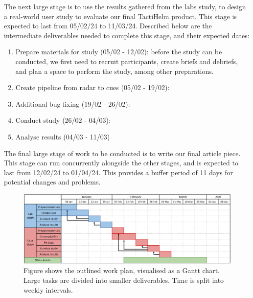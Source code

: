 \documentclass{interim}
\begin{document}
The next large stage is to use the results gathered from the labs study, to design a real-world user study to evaluate our final TactiHelm product. This stage is expected to last from 05/02/24 to 11/03/24. Described below are the intermediate deliverables needed to complete this stage, and their expected dates: 
\begin{enumerate}[label=2.\arabic*]
    \item Prepare materials for study (05/02 - 12/02): before the study can be conducted, we first need to recruit participants, create briefs and debriefs, and plan a space to perform the study, among other preparations.
    \item Create pipeline from radar to cues (05/02 - 19/02):
    \item Additional bug fixing (19/02 - 26/02):
    \item Conduct study (26/02 - 04/03):
    \item Analyse results (04/03 - 11/03)
\end{enumerate}

The final large stage of work to be conducted is to write our final article piece. This stage can run concurrently alongside the other stages, and is expected to last from 12/02/24 to 01/04/24. This provides a buffer period of 11 days for potential changes and problems.

\begin{figure}[!ht]
    \centering
    \includegraphics[width=1\textwidth]{images/work-plan.pdf}
    \caption{Figure shows the outlined work plan, visualised as a Gantt chart. Large tasks are divided into smaller deliverables. Time is split into weekly intervals.}
    \label{fig:work-plan}
\end{figure}




\end{document}
